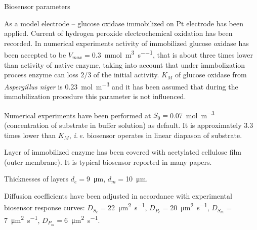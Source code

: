 \documentclass[hyperref={breaklinks=true},fleqn,mathserif]{beamer}
\begin{document}
\begin{frame}[shrink=21]{Biosensor parameters}

\begin{block}{}
As a model electrode -- glucose oxidase immobilized on Pt electrode has been applied.
Current of hydrogen peroxide electrochemical oxidation has been recorded.
In numerical experiments activity of immobilized glucose oxidase has been accepted to be $V_{max} ={}$\SI{0.3}{\milli\mole\per\metre\cubed\per\second},
that is about three times lower than activity of native enzyme, taking into account that under immbolization process enzyme can loss $2/3$ of the initial activity.
$K_M$ of glucose oxidase from \textit{Aspergillus niger} is \SI{0.23}{\mole\per\metre\cubed} and it has been assumed that during the immobilization procedure
this parameter is not influenced.

\smallskip
Numerical experiments have been performed at $S_0 ={}$\SI{0.07}{\mole\per\metre\cubed} (concentration of substrate in buffer solution) as default.
It is approximately $3.3$ times lower than $K_M$, \textit{i.\,e.} biosensor operates in linear diapason of substrate.
\end{block}

\pause
\begin{exampleblock}{}
Layer of immobilized enzyme has been covered with acetylated cellulose film (outer membrane).
It is typical biosensor reported in many papers.

\smallskip
Thicknesses of layers $d_e ={}$\SI{9}{\micro\metre}, $d_m ={}$\SI{10}{\micro\metre}.
\end{exampleblock}

\pause
\begin{block}{}
Diffusion coefficients have been adjusted in accordance with experimental biosensor response curves:
$D_{S_e} ={}$\SI{22}{\micro\metre\squared\per\second}, $D_{P_e} ={}$\SI{20}{\micro\metre\squared\per\second},
$D_{S_m} ={}$\SI{7}{\micro\metre\squared\per\second}, $D_{P_m} ={}$\SI{6}{\micro\metre\squared\per\second}. 
\end{block}

\end{frame}
\end{document}

